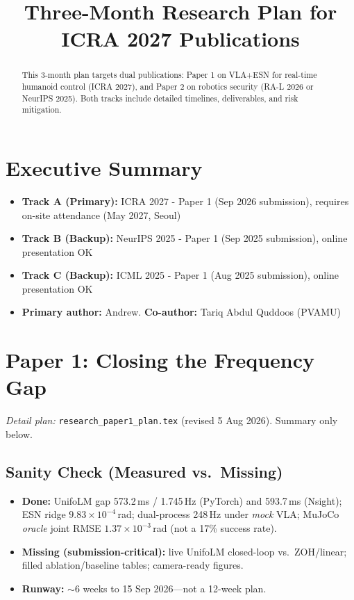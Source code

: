 \documentclass[conference]{IEEEtran}
\begin{document}
\title{Three-Month Research Plan for ICRA 2027 Publications}

\author{
\and
{}
}

\maketitle

\begin{abstract}
This 3-month plan targets dual publications: Paper 1 on VLA+ESN for real-time humanoid control (ICRA 2027), and Paper 2 on robotics security (RA-L 2026 or NeurIPS 2025). Both tracks include detailed timelines, deliverables, and risk mitigation.
\end{abstract}

\section{Executive Summary}
\begin{itemize}
    \item \textbf{Track A (Primary):} ICRA 2027 - Paper 1 (Sep 2026 submission), requires on-site attendance (May 2027, Seoul)
    \item \textbf{Track B (Backup):} NeurIPS 2025 - Paper 1 (Sep 2025 submission), online presentation OK
    \item \textbf{Track C (Backup):} ICML 2025 - Paper 1 (Aug 2025 submission), online presentation OK
    \item \textbf{Primary author:} Andrew. \textbf{Co-author:} Tariq Abdul Quddoos (PVAMU)
\end{itemize}

\section{Paper 1: Closing the Frequency Gap}
\noindent\emph{Detail plan:} \texttt{research\_paper1\_plan.tex} (revised 5 Aug 2026). Summary only below.

\subsection{Sanity Check (Measured vs.\ Missing)}
\begin{itemize}
    \item \textbf{Done:} UnifoLM gap 573.2\,ms / 1.745\,Hz (PyTorch) and 593.7\,ms (Nsight); ESN ridge $9.83\times10^{-4}$\,rad; dual-process 248\,Hz under \emph{mock} VLA; MuJoCo \emph{oracle} joint RMSE $1.37\times10^{-3}$\,rad (not a 17\% success rate).
    \item \textbf{Missing (submission-critical):} live UnifoLM closed-loop vs.\ ZOH/linear; filled ablation/baseline tables; camera-ready figures.
    \item \textbf{Runway:} $\sim$6 weeks to 15 Sep 2026---not a 12-week plan.
\end{itemize}
\end{document}
